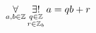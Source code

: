 \[
\operatornamewithlimits
\forall_{a, b \in \mathbb Z}
\mathop
{\exists!}
_{\substack{
q \in \mathbb Z \\
r \in \mathbb Z _b
}}
a=qb+r
\]
